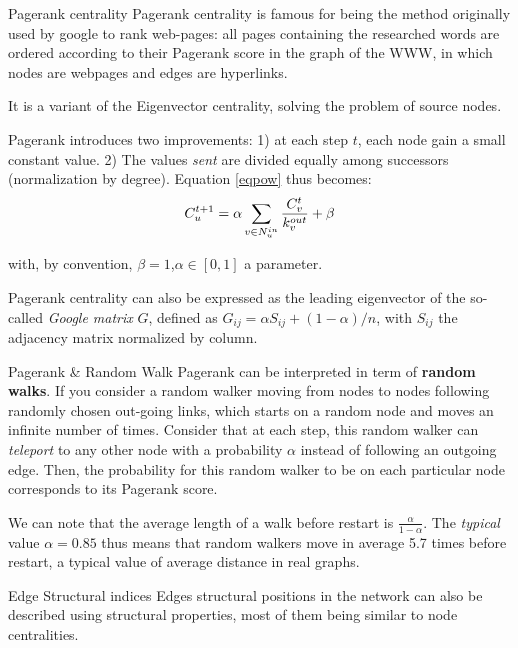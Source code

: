 \begin{textbox}{Pagerank centrality}
    Pagerank centrality is famous for being the method originally used by google to rank web-pages: all pages containing the researched words are ordered according to their Pagerank score in the graph of the WWW, in which nodes are webpages and edges are hyperlinks.

    It is a variant of the Eigenvector centrality, solving the problem of source nodes.

    Pagerank introduces two improvements: 1) at each step $t$, each node gain a small constant value. 2) The values \textit{sent} are divided equally among successors (normalization by degree). Equation \ref{eqpow} thus becomes:
    \begin{equation}
        \centering
        C^{t+1}_u = \alpha \sum_{v\in N^{in}_u} \frac{C^t_v}{k^{out}_v} + \beta
    \end{equation}

    with, by convention, $\beta=1$,$\alpha \in [0,1]$ a parameter.

    Pagerank centrality can also be expressed as the leading eigenvector of the so-called \textit{Google matrix} $G$, defined as $G_{ij} = \alpha S_{ij} + (1- \alpha)/n$, with $S_{ij}$ the adjacency matrix normalized by column.
\end{textbox}


\begin{textbox}{Pagerank \& Random Walk}
    Pagerank can be interpreted in term of \textbf{random walks}. If you consider a random walker moving from nodes to nodes following randomly chosen out-going links, which starts on a random node and moves an infinite number of times. Consider that at each step, this random walker can \textit{teleport} to any other node with a probability $\alpha$ instead of following an outgoing edge. Then, the probability for this random walker to be on each particular node corresponds to its Pagerank score.

    We can note that the average length of a walk before restart is $\frac{\alpha}{1-\alpha}$. The \textit{typical} value $\alpha=0.85$ thus means that random walkers move in average 5.7 times before restart, a typical value of average distance in real graphs.
\end{textbox}


\begin{textbox}{Edge Structural indices}
    Edges structural positions in the network can also be described using structural properties, most of them being similar to node centralities.
\end{textbox}


